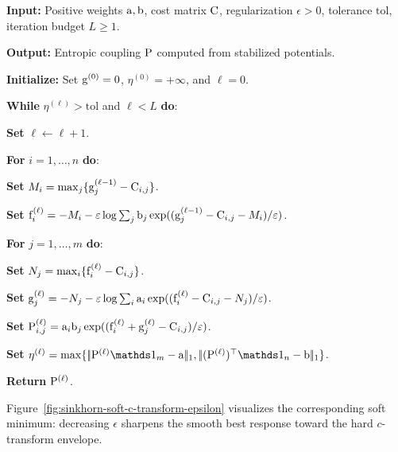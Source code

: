 \begin{algH}\label{alg:log-domain-sinkhorn}
\textbf{Input:} Positive weights $\a,\b$, cost matrix $\C$, regularization $\epsilon>0$, tolerance $\mathrm{tol}$, iteration budget $L\geq1$.

\textbf{Output:} Entropic coupling $\P$ computed from stabilized potentials.

\textbf{Initialize:} Set $\gD^{(0)}=0$, \(\eta^{(0)}=+\infty\), and \(\ell=0\).

\textbf{While} \(\eta^{(\ell)}>\mathrm{tol}\) and $\ell<L$ \textbf{do}:
\begin{algblock}

\textbf{Set} \(\ell\leftarrow \ell+1\).

\textbf{For} $i=1,\ldots,n$ \textbf{do}:
\begin{algblock}
\textbf{Set} $M_i=\max_j\{\gD_j^{(\ell-1)}-\C_{i,j}\}$.

\textbf{Set} $\fD_i^{(\ell)}=-M_i-\epsilon\log\sum_j\b_j
\exp((\gD_j^{(\ell-1)}-\C_{i,j}-M_i)/\epsilon)$.
\end{algblock}

\textbf{For} $j=1,\ldots,m$ \textbf{do}:
\begin{algblock}
\textbf{Set} $N_j=\max_i\{\fD_i^{(\ell)}-\C_{i,j}\}$.

\textbf{Set} $\gD_j^{(\ell)}=-N_j-\epsilon\log\sum_i\a_i
\exp((\fD_i^{(\ell)}-\C_{i,j}-N_j)/\epsilon)$.
\end{algblock}

\textbf{Set} $\P_{i,j}^{(\ell)}=\a_i\b_j
\exp((\fD_i^{(\ell)}+\gD_j^{(\ell)}-\C_{i,j})/\epsilon)$.

\textbf{Set} \(\eta^{(\ell)}=\max\{\norm{\P^{(\ell)}\ones_m-\a}_1,
\norm{(\P^{(\ell)})^\top\ones_n-\b}_1\}\).
\end{algblock}
\algreturnskip
\textbf{Return} \(\P^{(\ell)}\).
\end{algH}

Figure~\ref{fig:sinkhorn-soft-c-transform-epsilon} visualizes the corresponding soft minimum: decreasing $\epsilon$ sharpens the smooth best response toward the hard $c$-transform envelope.

